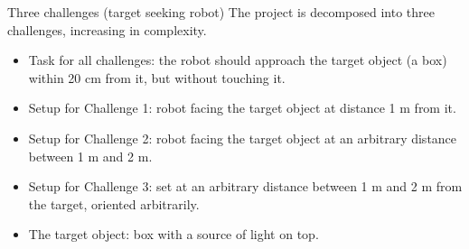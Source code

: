 \documentclass[aspectratio=1610]{beamer}
\begin{document}
\begin{frame}[t,plain]{Three challenges (target seeking robot)}
The project is decomposed into three challenges, increasing in
complexity.

\medskip
\begin{itemize}
\item Task for all challenges: the robot should approach the target
  object (a box) within 20 cm from it, but without touching it.

\medskip
\item Setup for Challenge 1: robot facing the target object at
  distance 1 m from it.
 \item Setup for Challenge 2: robot facing the target object at an
   arbitrary distance between 1 m and 2 m.
\item Setup for Challenge 3: set at an arbitrary distance between 1 m
  and 2 m from the target, oriented arbitrarily.

\medskip
\item The target object: box with a source of light on top. 
\end{itemize}

\end{frame}
\end{document}
